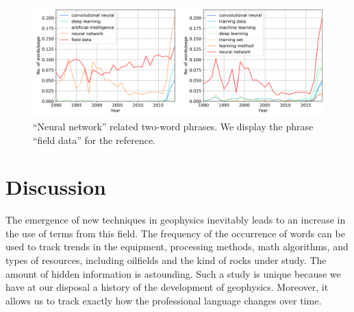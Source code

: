 \documentclass[geosciences,article,submit,moreauthors,pdftex]{Definitions/mdpi}
\begin{document}
\begin{figure}[ht!]
\includegraphics[width=\textwidth]{nn_related_all.png} 
\caption{``Neural network'' related two-word phrases. We display the phrase ``field data'' for the reference.}
\label{neur_netw}
\end{figure}


\section{Discussion}

The emergence of new techniques in geophysics inevitably leads to an increase in the use of terms from this field. The frequency of the occurrence of words can be used to track trends in the equipment, processing methods, math algorithms, and types of resources, including oilfields and the kind of rocks under study. The amount of hidden information is astounding. Such a study is unique because we have at our disposal a history of the development of geophysics. Moreover, it allows us to track exactly how the professional language changes over time.
\end{document}
